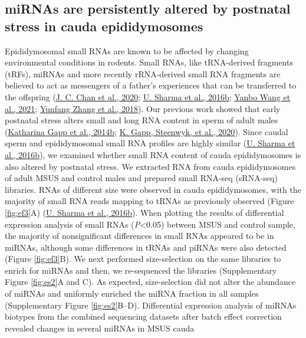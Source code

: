 \documentclass[12pt,twoside]{reedthesis}
\begin{document}
\hypertarget{mirnas-are-persistently-altered-by-postnatal-stress-in-cauda-epididymosomes}{%
\subsection{miRNAs are persistently altered by postnatal stress in cauda epididymosomes}\label{mirnas-are-persistently-altered-by-postnatal-stress-in-cauda-epididymosomes}}

Epididymosomal small RNAs are known to be affected by changing
environmental conditions in rodents. Small RNAs, like tRNA-derived
fragments (tRFs), miRNAs and more recently rRNA-derived small RNA
fragments are believed to act as messengers of a father's experiences
that can be transferred to the offspring (\protect\hyperlink{ref-chan_2020}{J. C. Chan et al., 2020}; \protect\hyperlink{ref-sharma_2016}{U. Sharma et al., 2016b}; \protect\hyperlink{ref-wang_2021}{Yanbo Wang et al., 2021}; \protect\hyperlink{ref-zhang_2018}{Yunfang Zhang et al., 2018}). Our previous work showed that early postnatal
stress alters small and long RNA content in sperm of adult males
(\protect\hyperlink{ref-gapp_2014}{Katharina Gapp et al., 2014b}; \protect\hyperlink{ref-gapp_2020}{K. Gapp, Steenwyk, et al., 2020}). Since caudal sperm and epididymosomal small RNA
profiles are highly similar (\protect\hyperlink{ref-sharma_2016}{U. Sharma et al., 2016b}), we examined whether small RNA
content of cauda epididymosomes is also altered by postnatal stress. We
extracted RNA from cauda epididymosomes of adult MSUS and control males
and prepared small RNA-seq (sRNA-seq) libraries. RNAs of different size
were observed in cauda epididymosomes, with the majority of small RNA
reads mapping to tRNAs as previously observed (Figure \ref{fig:ef3}A)
(\protect\hyperlink{ref-sharma_2016}{U. Sharma et al., 2016b}). When plotting the results of differential expression
analysis of small RNAs (\emph{P}\textless0.05) between MSUS and control sample, the
majority of nonsignificant differences in small RNAs appeared to be in
miRNAs, although some differences in tRNAs and piRNAs were also detected
(Figure \ref{fig:ef3}B). We next performed size-selection on the same libraries to
enrich for miRNAs and then, we re-sequenced the libraries
(Supplementary Figure \ref{fig:es2}A and C). As expected, size-selection did not
alter the abundance of miRNAs and uniformly enriched the miRNA fraction
in all samples (Supplementary Figure \ref{fig:es2}B--D). Differential expression
analysis of miRNAs biotypes from the combined sequencing datasets after
batch effect correction revealed changes in several miRNAs in MSUS cauda
\end{document}
